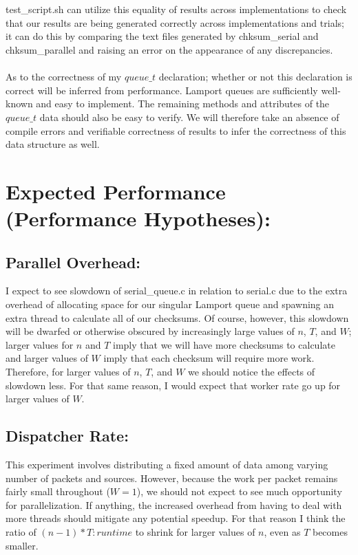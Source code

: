 \documentclass[]{article}
\begin{document}
\\\\
test\_script.sh can utilize this equality of results across implementations to check that our results are being generated correctly across implementations and trials; it can do this by comparing the text files generated by chksum\_serial and chksum\_parallel and raising an error on the appearance of any discrepancies.
\\\\
As to the correctness of my $queue\_t$ declaration; whether or not this declaration is correct will be inferred from performance. Lamport queues are sufficiently well-known and easy to implement. The remaining methods and attributes of the $queue\_t$ data should also be easy to verify. We will therefore take an absence of compile errors and verifiable correctness of results to infer the correctness of this data structure as well.

\section{Expected Performance (Performance Hypotheses):} 
\subsection{Parallel Overhead:}
I expect to see slowdown of serial\_queue.c in relation to serial.c due to the extra overhead of allocating space for our singular Lamport queue and spawning an extra thread to calculate all of our checksums. Of course, however, this slowdown will be dwarfed or otherwise obscured by increasingly large values of $n$, $T$, and $W$; larger values for $n$ and $T$ imply that we will have more checksums to calculate and larger values of $W$ imply that each checksum will require more work. Therefore, for larger values of $n$, $T$, and $W$ we should notice the effects of slowdown less.
For that same reason, I would expect that worker rate go up for larger values of $W$.
\subsection{Dispatcher Rate:}
This experiment involves distributing a fixed amount of data among varying number of packets and sources. However, because the work per packet remains fairly small throughout ($W = 1$), we should not expect to see much opportunity for parallelization. If anything, the increased overhead from having to deal with more threads should mitigate any potential speedup. For that reason I think the ratio of $(n - 1) * T : runtime$ to shrink for larger values of $n$, even as $T$ becomes smaller.
\end{document}

